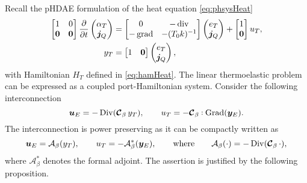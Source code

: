 Recall the pHDAE formulation of the heat equation \eqref{eq:phsysHeat}
\begin{equation}
\begin{aligned}
\begin{bmatrix}
1 & 0 \\
\bm{0} & \bm{0} \\
\end{bmatrix}
\diffp{}{t}
\begin{pmatrix}
\alpha_T \\
\bm{j}_Q \\
\end{pmatrix} &= 
\begin{bmatrix}
0 & -\div \\
-\grad & -(T_0 k)^{-1} \\
\end{bmatrix}
\begin{pmatrix}
e_T \\
\bm{j}_Q \\
\end{pmatrix} + 
\begin{bmatrix}
1 \\
\bm{0} \\
\end{bmatrix} u_T, \\
y_T &= \begin{bmatrix}
1 & \bm{0} \\
\end{bmatrix} \begin{pmatrix}
e_T \\
\bm{j}_Q \\
\end{pmatrix},
\end{aligned}
\end{equation} 
with Hamiltonian $H_T$ defined in \eqref{eq:hamHeat}. The linear thermoelastic problem can be expressed as a coupled port-Hamiltonian system.  Consider the following interconnection
\begin{equation}
\bm{u}_E = - \Div(\bm{\mathcal{C}}_\beta \, y_T), \qquad
u_T = - \bm{\mathcal{C}}_\beta \cddot\Grad(\bm{y}_E). 
\end{equation}
The interconnection is power preserving as it can be compactly written as 
\begin{equation}\label{eq:coup_operThElas}
\bm{u}_E = \mathcal{A}_\beta(y_T), \qquad u_T = - \mathcal{A}_\beta^*(\bm{y}_E), \qquad \text{where} \qquad  \mathcal{A}_\beta(\cdot) = - \operatorname*{Div}(\bm{\mathcal{C}}_\beta \, \cdot),
\end{equation}
where $\mathcal{A}_\beta^*$ denotes the formal adjoint. The assertion is justified by the following proposition.

